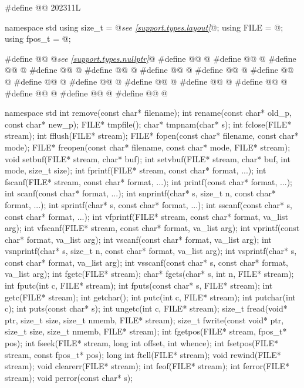 \begin{codeblock}
#define @@ 202311L

namespace std {
  using size_t = @\textit{see \ref{support.types.layout}}@;
  using FILE = @\seebelow@;
  using fpos_t = @\seebelow@;
}

#define @@ @\textit{see \ref{support.types.nullptr}}@
#define @@ @\seebelow@
#define @@ @\seebelow@
#define @@ @\seebelow@
#define @@ @\seebelow@
#define @@ @\seebelow@
#define @@ @\seebelow@
#define @@ @\seebelow@
#define @@ @\seebelow@
#define @@ @\seebelow@
#define @@ @\seebelow@
#define @@ @\seebelow@
#define @@ @\seebelow@
#define @@ @\seebelow@
#define @@ @\seebelow@
#define @@ @\seebelow@
#define @@ @\seebelow@

namespace std {
  int remove(const char* filename);
  int rename(const char* old_p, const char* new_p);
  FILE* tmpfile();
  char* tmpnam(char* s);
  int fclose(FILE* stream);
  int fflush(FILE* stream);
  FILE* fopen(const char* filename, const char* mode);
  FILE* freopen(const char* filename, const char* mode, FILE* stream);
  void setbuf(FILE* stream, char* buf);
  int setvbuf(FILE* stream, char* buf, int mode, size_t size);
  int fprintf(FILE* stream, const char* format, ...);
  int fscanf(FILE* stream, const char* format, ...);
  int printf(const char* format, ...);
  int scanf(const char* format, ...);
  int snprintf(char* s, size_t n, const char* format, ...);
  int sprintf(char* s, const char* format, ...);
  int sscanf(const char* s, const char* format, ...);
  int vfprintf(FILE* stream, const char* format, va_list arg);
  int vfscanf(FILE* stream, const char* format, va_list arg);
  int vprintf(const char* format, va_list arg);
  int vscanf(const char* format, va_list arg);
  int vsnprintf(char* s, size_t n, const char* format, va_list arg);
  int vsprintf(char* s, const char* format, va_list arg);
  int vsscanf(const char* s, const char* format, va_list arg);
  int fgetc(FILE* stream);
  char* fgets(char* s, int n, FILE* stream);
  int fputc(int c, FILE* stream);
  int fputs(const char* s, FILE* stream);
  int getc(FILE* stream);
  int getchar();
  int putc(int c, FILE* stream);
  int putchar(int c);
  int puts(const char* s);
  int ungetc(int c, FILE* stream);
  size_t fread(void* ptr, size_t size, size_t nmemb, FILE* stream);
  size_t fwrite(const void* ptr, size_t size, size_t nmemb, FILE* stream);
  int fgetpos(FILE* stream, fpos_t* pos);
  int fseek(FILE* stream, long int offset, int whence);
  int fsetpos(FILE* stream, const fpos_t* pos);
  long int ftell(FILE* stream);
  void rewind(FILE* stream);
  void clearerr(FILE* stream);
  int feof(FILE* stream);
  int ferror(FILE* stream);
  void perror(const char* s);
}
\end{codeblock}

